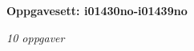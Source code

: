 \centerline{\bf Oppgavesett: i01430no-i01439no}
\vskip 10pt
\centerline{\it 10 oppgaver}\vskip 10pt
\vskip 10pt
